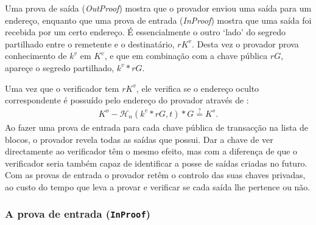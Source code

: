 Uma prova de saída ({\em OutProof}) mostra que o provador enviou uma saída para um endereço, enquanto que uma prova de entrada ({\em InProof}) mostra que uma saída foi recebida por um certo endereço. É essencialmente o outro `lado' do segredo partilhado entre o remetente e o destinatário, $r K^v$. Desta vez o provador prova conhecimento de $k^v$ em $K^v$, e que em combinação com a chave pública $r G$, apareçe o segredo partilhado, $k^v*r G$. 

Uma vez que o verificador tem $r K^v$, ele verifica se o endereço oculto correspondente é possuído pelo endereço do provador através de : 
\begin{align*}
K^o - \mathcal{H}_n(k^v*rG,t)*G \stackrel{?}{=} K^s .
\end{align*}
Ao fazer uma prova de entrada para cada chave pública de transacção na lista de blocos, o provador revela todas as saídas que possui.%
Dar a chave de ver directamente ao verificador têm o mesmo efeito, mas com a diferença de que o verificador seria também capaz de identificar a posse de saídas criadas no futuro. Com as provas de entrada o provador retêm o controlo das suas chaves privadas, ao custo do tempo que leva a provar e verificar se cada saída lhe pertence ou não.

\subsubsection*{A prova de entrada ({\tt InProof})}

